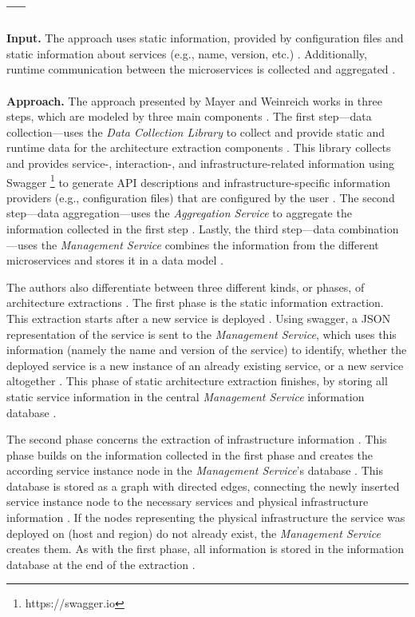\subsection{--- \cite{Mayer2018}}
\label{sec:Results:Mayer}
\textbf{Input.}
The approach uses static information, provided by configuration files and static information about services (e.g., name, version, etc.) \cite{Mayer2018}.
Additionally, runtime communication between the microservices is collected and aggregated \cite{Mayer2018}.
\\ \\
\textbf{Approach.}
The approach presented by Mayer and Weinreich works in three steps, which are modeled by three main components \cite{Mayer2018}.
The first step---data collection---uses the \textit{Data Collection Library} to collect and provide static and runtime data for the architecture extraction components \cite{Mayer2018}.
This library collects and provides service-, interaction-, and infrastructure-related information using Swagger \footnote{https://swagger.io} to generate API descriptions and infrastructure-specific information providers (e.g., configuration files) that are configured by the user \cite{Mayer2018}.
The second step---data aggregation---uses the \textit{Aggregation Service} to aggregate the information collected in the first step \cite{Mayer2018}.
Lastly, the third step---data combination---uses the \textit{Management Service} combines the information from the different microservices and stores it in a data model \cite{Mayer2018}.

The authors also differentiate between three different kinds, or phases, of architecture extractions \cite{Mayer2018}.
The first phase is the static information extraction.
This extraction starts after a new service is deployed \cite{Mayer2018}.
Using swagger, a JSON representation of the service is sent to the \textit{Management Service}, which uses this information (namely the name and version of the service) to identify, whether the deployed service is a new instance of an already existing service, or a new service altogether \cite{Mayer2018}.
This phase of static architecture extraction finishes, by storing all static service information in the central \textit{Management Service} information database \cite{Mayer2018}.

The second phase concerns the extraction of infrastructure information \cite{Mayer2018}.
This phase builds on the information collected in the first phase and creates the according service instance node in the \textit{Management Service}'s database \cite{Mayer2018}.
This database is stored as a graph with directed edges, connecting the newly inserted service instance node to the necessary services and physical infrastructure information \cite{Mayer2018}.
If the nodes representing the physical infrastructure the service was deployed on (host and region) do not already exist, the \textit{Management Service} creates them.
As with the first phase, all information is stored in the information database at the end of the extraction \cite{Mayer2018}.

